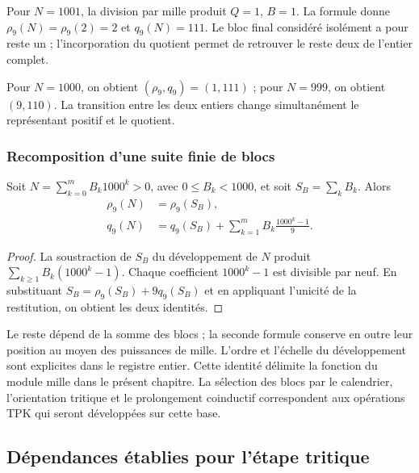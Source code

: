 \begin{ejemplo}
Pour $N=1001$, la division par mille produit $Q=1$, $B=1$. La formule donne $\rho_9(N)=\rho_9(2)=2$ et $q_9(N)=111$. Le bloc final considéré isolément a pour reste un ; l'incorporation du quotient permet de retrouver le reste deux de l'entier complet.

Pour $N=1000$, on obtient $(\rho_9,q_9)=(1,111)$ ; pour $N=999$, on obtient $(9,110)$. La transition entre les deux entiers change simultanément le représentant positif et le quotient.
\end{ejemplo}

\subsubsection{Recomposition d'une suite finie de blocs}

\begin{bloqueindivisible}
\begin{corolario}
\label{cor:app-bloques}
Soit $N=\sum_{k=0}^{m}B_k1000^k>0$, avec $0\leq B_k<1000$, et soit $S_B=\sum_kB_k$. Alors
\begin{align}
 \rho_9(N)&=\rho_9(S_B),\\
 q_9(N)&=q_9(S_B)+
 \sum_{k=1}^{m}B_k\frac{1000^k-1}{9}.
 \label{eq:app-blocks-complete}
\end{align}
\end{corolario}

\begin{proof}
La soustraction de $S_B$ du développement de $N$ produit $\sum_{k\geq1}B_k(1000^k-1)$. Chaque coefficient $1000^k-1$ est divisible par neuf. En substituant $S_B=\rho_9(S_B)+9q_9(S_B)$ et en appliquant l'unicité de la restitution, on obtient les deux identités.
\end{proof}
\end{bloqueindivisible}

Le reste dépend de la somme des blocs ; la seconde formule conserve en outre leur position au moyen des puissances de mille. L'ordre et l'échelle du développement sont explicites dans le registre entier. Cette identité délimite la fonction du module mille dans le présent chapitre. La sélection des blocs par le calendrier, l'orientation tritique et le prolongement coinductif correspondent aux opérations TPK qui seront développées sur cette base.

\subsection{Dépendances établies pour l'étape tritique}
\label{sec:app-dependencias}


